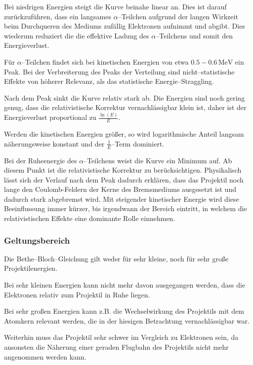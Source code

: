 \documentclass[12pt,a4paper]{scrartcl}
\numberwithin{equation}{section} %
\begin{document}
Bei niedrigen Energien steigt die Kurve beinahe linear an. Dies ist darauf zurückzuführen, dass ein langsames $\alpha$--Teilchen aufgrund der langen Wirkzeit beim Durchqueren des Mediums zufällig Elektronen aufnimmt und abgibt. Dies wiederum reduziert die die effektive Ladung des $\alpha$--Teilchens und somit den Energieverlust.

Für $\alpha$--Teilchen findet sich bei kinetischen Energien von etwa $0.5-0.6\mathrm{\,MeV}$ ein Peak. Bei der Verbreiterung des Peaks der Verteilung sind nicht--statistische Effekte von höherer Relevanz, als das statistische Energie--Straggling.

Nach dem Peak sinkt die Kurve relativ stark ab. Die Energien sind noch gering genug, dass die relativistische Korrektur vernachlässigbar klein ist, daher ist der Energieverlust proportional zu $\frac{\ln(E)}{E}$.

Werden die kinetischen Energien größer, so wird logarithmische Anteil langsam näherungsweise konstant und der $\frac{1}{E}$--Term dominiert.

Bei der Ruheenergie des $\alpha$--Teilchens weist die Kurve ein Minimum auf. Ab diesem Punkt ist die relativistische Korrektur zu berücksichtigen. Physikalisch lässt sich der Verlauf nach dem Peak dadurch erklären, dass das Projektil noch lange den Coulomb-Feldern der Kerne des Bremsmediums ausgesetzt ist und dadurch stark abgebremst wird. Mit steigender kinetischer Energie wird diese Beeinflussung immer kürzer, bis irgendwann der Bereich eintritt, in welchem die relativistischen Effekte eine dominante Rolle einnehmen.

\hypertarget{geltungsbereich}{%
\subsubsection{Geltungsbereich}\label{geltungsbereich}}

Die Bethe--Bloch--Gleichung gilt weder für sehr kleine, noch für sehr große Projektilenergien.

Bei sehr kleinen Energien kann nicht mehr davon ausgegangen werden, dass die Elektronen relativ zum Projektil in Ruhe liegen.

Bei sehr großen Energien kann z.B. die Wechselwirkung des Projektils mit dem Atomkern relevant werden, die in der hiesigen Betrachtung vernachlässigbar war.

Weiterhin muss das Projektil sehr schwer im Vergleich zu Elektronen sein, da ansonsten die Näherung einer geraden Flugbahn des Projektils nicht mehr angenommen werden kann.
\end{document}
